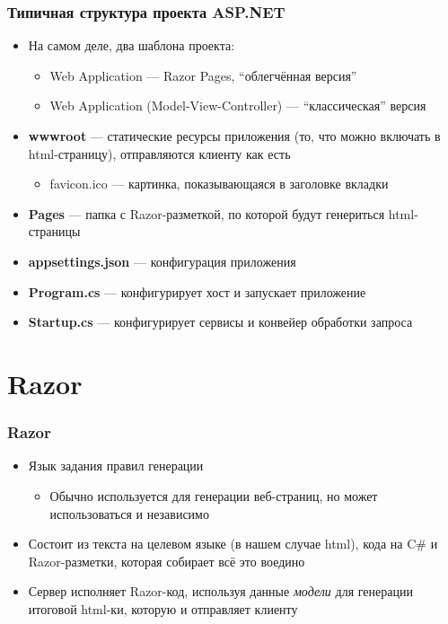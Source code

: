 \documentclass[xetex,mathserif,serif]{beamer}
\begin{document}
    \begin{frame}
        \frametitle{Типичная структура проекта ASP.NET}
        \begin{itemize}
            \item На самом деле, два шаблона проекта:
            \begin{itemize}
                \item Web Application --- Razor Pages, ``облегчённая версия''
                \item Web Application (Model-View-Controller) --- ``классическая'' версия
            \end{itemize}
            \item \textbf{wwwroot} --- статические ресурсы приложения (то, что можно включать в html-страницу), отправляются клиенту как есть
            \begin{itemize}
                \item favicon.ico --- картинка, показывающаяся в заголовке вкладки
            \end{itemize}
            \item \textbf{Pages} --- папка с Razor-разметкой, по которой будут генериться html-страницы
            \item \textbf{appsettings.json} --- конфигурация приложения
            \item \textbf{Program.cs} --- конфигурирует хост и запускает приложение
            \item \textbf{Startup.cs} --- конфигурирует сервисы и конвейер обработки запроса
        \end{itemize}
    \end{frame}

    \section{Razor}

    \begin{frame}
        \frametitle{Razor}
        \begin{itemize}
            \item Язык задания правил генерации
            \begin{itemize}
                \item Обычно используется для генерации веб-страниц, но может использоваться и независимо
            \end{itemize}
            \item Состоит из текста на целевом языке (в нашем случае html), кода на C\# и Razor-разметки, которая собирает всё это воедино
            \item Сервер исполняет Razor-код, используя данные \textit{модели} для генерации итоговой html-ки, которую и отправляет клиенту
        \end{itemize}
    \end{frame}
\end{document}
